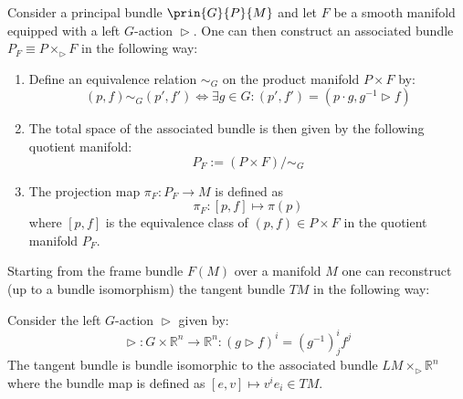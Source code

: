 	\begin{construct}
		Consider a principal bundle $\prin{G}{P}{M}$ and let $F$ be a smooth manifold equipped with a left $G$-action $\vartriangleright$. One can then construct an associated bundle $P_F \equiv P \times_\vartriangleright F$ in the following way:
		\begin{enumerate}
			\item Define an equivalence relation $\sim_G$ on the product manifold $P\times F$ by:
			\begin{equation}
				(p, f)\sim_G (p', f')\iff \exists g\in G: (p', f') = (p\cdot g, g^{-1}\vartriangleright f)
			\end{equation}
			\item The total space of the associated bundle is then given by the following quotient manifold:
			\begin{equation}
				P_F := (P\times F)/\sim_G
			\end{equation}
			\item The projection map $\pi_F:P_F\rightarrow M$ is defined as
			\begin{equation}
				\pi_F:[p, f]\mapsto \pi(p)
			\end{equation}
			where $[p, f]$ is the equivalence class of $(p, f)\in P\times F$ in the quotient manifold $P_F$.
		\end{enumerate}
	\end{construct}
	
	\begin{example}
		Starting from the frame bundle $F(M)$ over a manifold $M$ one can reconstruct (up to a bundle isomorphism) the tangent bundle $TM$ in the following way:
		
		Consider the left $G$-action $\vartriangleright$ given by:
		\begin{equation}
			\vartriangleright:G\times\mathbb{R}^n\rightarrow\mathbb{R}^n : (g\vartriangleright f)^i = (g^{-1})^i_jf^j
		\end{equation}
		The tangent bundle is bundle isomorphic to the associated bundle $LM\times_\vartriangleright \mathbb{R}^n$ where the bundle map is defined as $[e, v]\mapsto v^ie_i \in TM$.
	\end{example}
	
